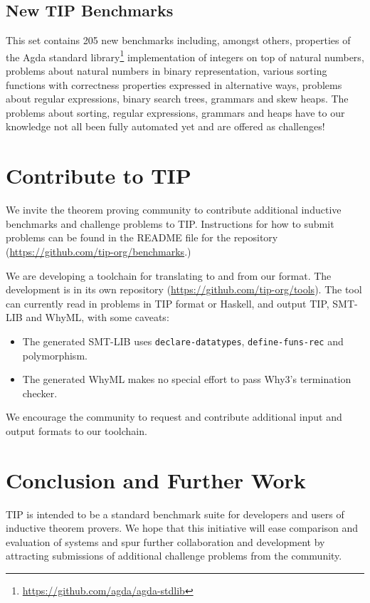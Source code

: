 \documentclass{llncs}
\begin{document}
\subsection{New TIP Benchmarks}
This set contains 205 new benchmarks including, amongst others,
properties of the Agda standard
library\footnote{\url{https://github.com/agda/agda-stdlib}}
implementation of integers on top of natural numbers, problems about natural numbers in binary representation, various sorting functions with correctness properties expressed in alternative ways, problems about regular expressions, binary search trees, grammars and skew heaps. The problems about sorting, regular expressions, grammars and heaps have to our knowledge not all been fully automated yet and are offered as challenges!

\section{Contribute to TIP}
We invite the theorem proving community to contribute additional inductive
benchmarks and challenge problems to TIP. Instructions for how to submit
problems can be found in the README file for the repository
(\url{https://github.com/tip-org/benchmarks}.)

We are developing a toolchain for translating to and from our format. The
development is in its own repository
(\url{https://github.com/tip-org/tools}).
The tool can currently read in problems in TIP format or Haskell, and
output TIP, SMT-LIB and WhyML, with some caveats:
\begin{itemize}
  \item The generated SMT-LIB uses \verb|declare-datatypes|,
    \verb|define-funs-rec| and polymorphism.
  \item The generated WhyML makes no special effort to pass Why3's
    termination checker.
\end{itemize}
We encourage the community to request and contribute additional input
and output formats to our toolchain.

\section{Conclusion and Further Work}

TIP is intended to be a standard benchmark suite for developers 
and users of inductive theorem provers. We hope that this 
initiative will ease comparison and evaluation of systems and 
spur further collaboration and development by attracting 
submissions of additional challenge problems from the community.
\end{document}
